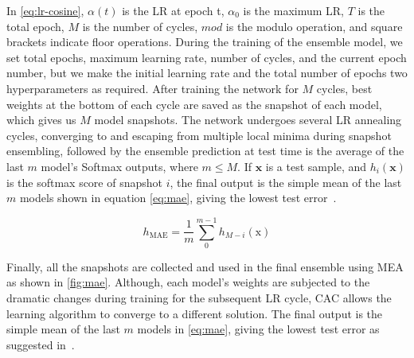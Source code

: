 \hspace*{3.5mm} In \cref{eq:lr-cosine}, $\alpha(t)$ is the LR at epoch t, $\alpha_0$ is the maximum LR, $T$ is the total epoch, $M$ is the number of cycles, $mod$ is the modulo operation, and square brackets indicate floor operations. During the training of the ensemble model, we set total epochs, maximum learning rate, number of cycles, and the current epoch number, but we make the initial learning rate and the total number of epochs two hyperparameters as required. After training the network for $M$ cycles, best weights at the bottom of each cycle are saved as the snapshot of each model, which gives us $M$ model snapshots. The network undergoes several LR annealing cycles, converging to and escaping from multiple local minima during snapshot ensembling, followed by the ensemble prediction at test time is the average of the last $m$ model's Softmax outputs, where $m \leq M$. If $\mathbf{x}$ is a test sample, and $h_i \left(\mathbf{x} \right)$ is the softmax score of snapshot $i$, the final output is the simple mean of the last $m$ models shown in equation \ref{eq:mae}, giving the lowest test error~\cite{huang2017snapshot}. 

\vspace{-2mm}
\begin{equation}
    h_{\mathrm{MAE}}=\frac{1}{m} \sum_{0}^{m-1} h_{M-i}(\mathrm{x})
    \label{eq:mae}
\end{equation}

\hspace*{3.5mm} Finally, all the snapshots are collected and used in the final ensemble using MEA as shown in \cref{fig:mae}. Although, each model's weights are subjected to the dramatic changes during training for the subsequent LR cycle, CAC allows the learning algorithm to converge to a different solution. The final output is the simple mean of the last $m$ models in \cref{eq:mae}, giving the lowest test error as suggested in~\cite{huang2017snapshot}. 


